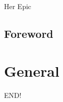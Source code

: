 \documentclass[a4paper,12pt,UTF8]{book}
\begin{document}
\author{dosconio}
\begin{center}
	\sc\fontsize{48pt}{0}\selectfont\textcolor[rgb]{1, 0.381, 0.618}{Her Epic}
\end{center}

\newpage %
\renewcommand{\contentsname}{Contents}
\tableofcontents

\section{Foreword} %

\chapter{General}





\newpage
END!%
\end{document}
